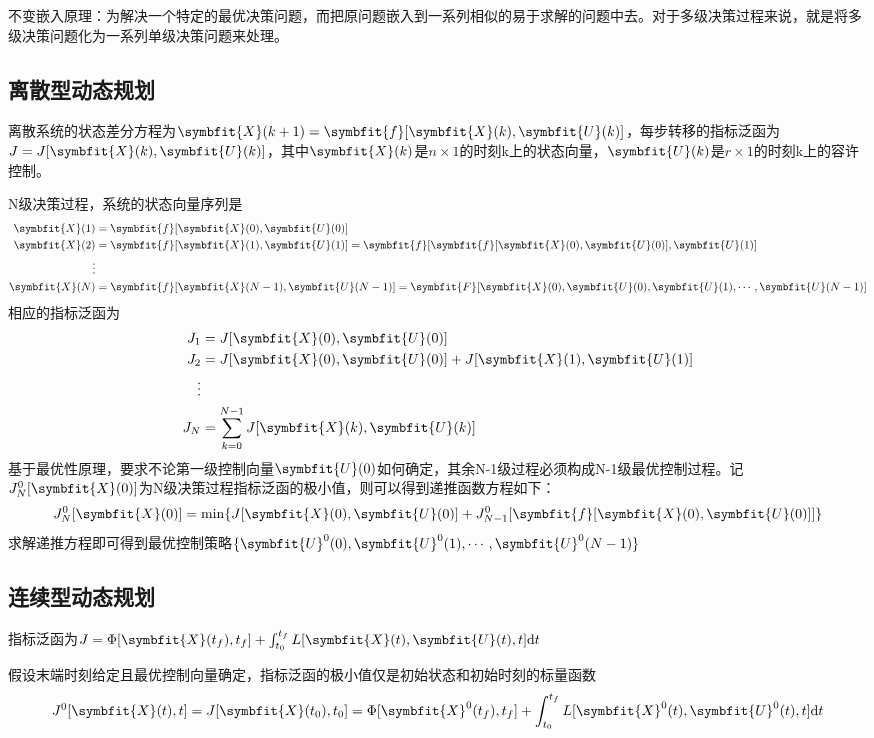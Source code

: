 \documentclass[11pt,a4paper]{ctexart}
\renewcommand{\d}{{\rm d}}
\newcommand{\bm}{\symbfit}
\begin{document}
    不变嵌入原理：为解决一个特定的最优决策问题，而把原问题嵌入到一系列相似的易于求解的问题中去。对于多级决策过程来说，就是将多级决策问题化为一系列单级决策问题来处理。
    \subsection{离散型动态规划}
        离散系统的状态差分方程为$\bm{X}(k+1)=\bm{f}[\bm{X}(k),\bm{U}(k)]$，每步转移的指标泛函为$J=J[\bm{X}(k),\bm{U}(k)]$，其中$\bm{X}(k)$是$n\times1$的时刻k上的状态向量，$\bm{U}(k)$是$r\times1$的时刻k上的容许控制。

        N级决策过程，系统的状态向量序列是
        \begin{align*}
            \bm{X}(1)&=\bm{f}[\bm{X}(0),\bm{U}(0)]\\
            \bm{X}(2)&=\bm{f}[\bm{X}(1),\bm{U}(1)]=\bm{f}[\bm{f}[\bm{X}(0),\bm{U}(0)],\bm{U}(1)]\\
            \vdots&\\
            \bm{X}(N)&=\bm{f}[\bm{X}(N-1),\bm{U}(N-1)]=\bm{F}[\bm{X}(0),\bm{U}(0),\bm{U}(1),\cdots,\bm{U}(N-1)]
        \end{align*}
        相应的指标泛函为
        \begin{align*}
            J_1&=J[\bm{X}(0),\bm{U}(0)]\\
            J_2&=J[\bm{X}(0),\bm{U}(0)]+J[\bm{X}(1),\bm{U}(1)]\\
            \vdots&\\
            J_N&=\sum\limits_{k=0}^{N-1}J[\bm{X}(k),\bm{U}(k)]
        \end{align*}
        基于最优性原理，要求不论第一级控制向量$\bm{U}(0)$如何确定，其余N-1级过程必须构成N-1级最优控制过程。记$J_N^0[\bm{X}(0)]$为N级决策过程指标泛函的极小值，则可以得到递推函数方程如下：
        \[
        J_N^0[\bm{X}(0)]=\min\{J[\bm{X}(0),\bm{U}(0)]+J_{N-1}^0[\bm{f}[\bm{X}(0),\bm{U}(0)]]\}
        \]
        求解递推方程即可得到最优控制策略$\{\bm{U}^0(0),\bm{U}^0(1),\cdots,\bm{U}^0(N-1)\}$
    \subsection{连续型动态规划}
        指标泛函为$J=\Phi[\bm{X}(t_f),t_f]+\int_{t_0}^{t_f}L[\bm{X}(t),\bm{U}(t),t]\d t$

        假设末端时刻给定且最优控制向量确定，指标泛函的极小值仅是初始状态和初始时刻的标量函数
        \[
        J^0[\bm{X}(t),t]=J[\bm{X}(t_0),t_0]=\Phi[\bm{X}^0(t_f),t_f]+\int_{t_0}^{t_f}L[\bm{X}^0(t),\bm{U}^0(t),t]\d t
        \]
\end{document}
